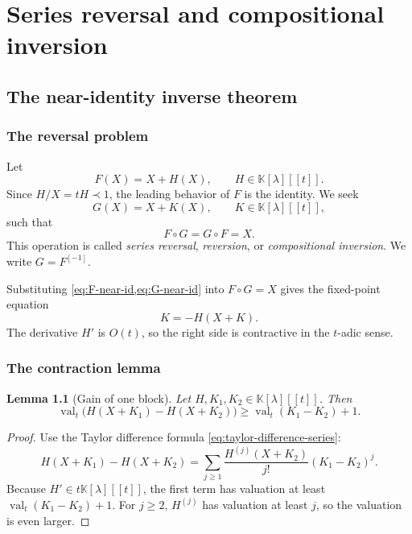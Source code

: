 \documentclass[11pt,openany]{book}
\theoremstyle{definition}
\theoremstyle{plain}
\newtheorem{lemma}{Lemma}[chapter]
\theoremstyle{remark}
\newcommand{\K}{\mathbb{K}}
\newcommand{\precdom}{\prec}
\newcommand{\invcomp}{^{[-1]}}
\DeclareMathOperator{\val}{val}
\begin{document}
\part{Series reversal and compositional inversion}\label{part:reversion}

\chapter{The near-identity inverse theorem}\label{ch:inverse-theorem}

\section{The reversal problem}
Let
\begin{equation}\label{eq:F-near-id}
 F(X)=X+H(X),
 \qquad H\in\K[\lambda][[t]].
\end{equation}
Since \(H/X=tH\precdom1\), the leading behavior of \(F\) is the identity. We seek
\begin{equation}\label{eq:G-near-id}
 G(X)=X+K(X),
 \qquad K\in\K[\lambda][[t]],
\end{equation}
such that
\begin{equation}\label{eq:two-sided-inverse}
 F\circ G=G\circ F=X.
\end{equation}
This operation is called \emph{series reversal}, \emph{reversion}, or \emph{compositional inversion}. We write \(G=F\invcomp\).

Substituting \cref{eq:F-near-id,eq:G-near-id} into \(F\circ G=X\) gives the fixed-point equation
\begin{equation}\label{eq:inverse-fixed-point}
 K=-H(X+K).
\end{equation}
The derivative \(H'\) is \(O(t)\), so the right side is contractive in the \(t\)-adic sense.

\section{The contraction lemma}
\begin{lemma}[Gain of one block]\label{lem:inverse-contraction}
Let \(H,K_1,K_2\in\K[\lambda][[t]]\). Then
\begin{equation}\label{eq:gain-one-H}
 \val_t\bigl(H(X+K_1)-H(X+K_2)\bigr)
 \ge \val_t(K_1-K_2)+1.
\end{equation}
\end{lemma}

\begin{proof}
Use the Taylor difference formula \cref{eq:taylor-difference-series}:
\[
 H(X+K_1)-H(X+K_2)
 =\sum_{j\ge1}\frac{H^{(j)}(X+K_2)}{j!}(K_1-K_2)^j.
\]
Because \(H'\in t\K[\lambda][[t]]\), the first term has valuation at least \(\val_t(K_1-K_2)+1\). For \(j\ge2\), \(H^{(j)}\) has valuation at least \(j\), so the valuation is even larger.
\end{proof}
\end{document}
